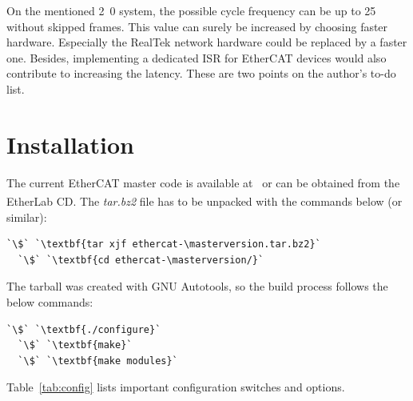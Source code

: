 \documentclass[a4paper,12pt,BCOR6mm,bibtotoc,idxtotoc]{scrbook}
\newcommand{\masterversion}{1.4.0}
\begin{document}
On the mentioned \unit{2.0}{\giga\hertz} system, the possible cycle frequency
can be up to \unit{25}{\kilo\hertz} without skipped frames. This value can
surely be increased by choosing faster hardware. Especially the RealTek network
hardware could be replaced by a faster one. Besides, implementing a dedicated
ISR for EtherCAT devices would also contribute to increasing the latency. These
are two points on the author's to-do list.


\chapter{Installation}
\label{sec:installation}

The current EtherCAT master code is available at~\cite{etherlab} or
can be obtained from the EtherLab\textsuperscript{\textregistered} CD.
The \textit{tar.bz2} file has to be unpacked with the commands below
(or similar):

\begin{lstlisting}[gobble=2]
  `\$` `\textbf{tar xjf ethercat-\masterversion.tar.bz2}`
  `\$` `\textbf{cd ethercat-\masterversion/}`
\end{lstlisting}

The tarball was created with GNU Autotools, so the build process
follows the below commands:

\begin{lstlisting}[gobble=2]
  `\$` `\textbf{./configure}`
  `\$` `\textbf{make}`
  `\$` `\textbf{make modules}`
\end{lstlisting}

Table~\ref{tab:config} lists important configuration switches and options.
\end{document}
